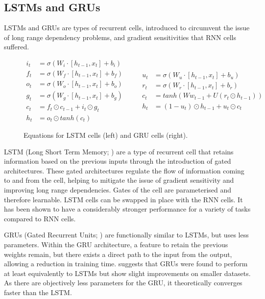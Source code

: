 \documentclass[12pt,twoside]{report}
\begin{document}
\subsection{LSTMs and GRUs} 

LSTMs and GRUs are types of recurrent cells, introduced to circumvent the issue of long range dependency problems, and gradient sensitivities that RNN cells suffered.

\begin{figure}[!ht]
\begin{equation}
  \begin{split}
    i_t &= \sigma(W_i \cdot [h_{t-1},x_t] + b_i) \\
    f_t &= \sigma(W_f \cdot [h_{t-1},x_t] + b_f) \\
		o_t &= \sigma(W_o \cdot [h_{t-1},x_t] + b_o) \\
		g_t &= \sigma(W_g \cdot [h_{t-1},x_t] + b_g) \\
		c_t &= f_t \odot c_{t-1} + i_t \odot g_t \\
		h_t &= o_t \odot tanh(c_t) 
  \end{split}
	\quad\quad
  \begin{split}
		u_t &= \sigma(W_u \cdot [h_{t-1},x_t] + b_u) \\
		r_t &= \sigma(W_r \cdot [h_{t-1},x_t] + b_r) \\
		c_t &= tanh(Ww_{t-1}+U(r_t \odot h_{t-1})) \\
		h_t &= (1-u_{t})\odot h_{t-1} + u_t \odot c_t
  \end{split}
\end{equation}
\caption{Equations for LSTM cells (left) and GRU cells (right).}
\end{figure}
 
LSTM (Long Short Term Memory; \cite{hochreiter_long_1997}) are a type of recurrent cell that retains information based on the previous inputs through the introduction of gated architectures. These gated architectures regulate the flow of information coming to and from the cell, helping to mitigate the issue of gradient sensitivity and improving long range dependencies. Gates of the cell are parameterised and therefore learnable. LSTM cells can be swapped in place with the RNN cells. It has been shown to have a considerably stronger performance for a variety of tasks compared to RNN cells.

GRUs (Gated Recurrent Units; \cite{cho_properties_2014}) are functionally similar to LSTMs, but uses less parameters. Within the GRU architecture, a feature to retain the previous weights remain, but there exists a direct path to the input from the output, allowing a reduction in training time. \cite{chung_empirical_2014} suggests that GRUs were found to perform at least equivalently to LSTMs but show slight improvements on smaller datasets. As there are objectively less parameters for the GRU, it theoretically converges faster than the LSTM.
\end{document}
